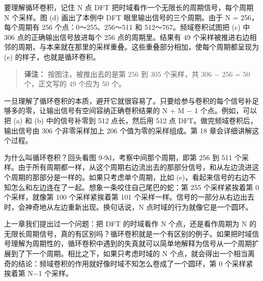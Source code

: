 要理解循环卷积，记住 N 点 DFT 把时域看作一个无限长的周期信号，每个周期 N
个采样。图 (d) 画出了本例中 DFT 眼里输出信号的三个周期。由于 N =
256，每个周期有 256 个点：0～255、256～511 和 512～767。频域卷积试图把
(c) 中 306 点的正确输出信号放进每个 256 点的周期里。结果有 49
个采样被推进右边相邻的周期，与本来就在那里的采样重叠。这些重叠部分相加，使每个周期都呈现为
(e) 的样子，也就是循环卷积。

\begin{quote}
\textbf{译注：} 按图注，被推出去的是第 256 到 305 个采样，共 306 − 256 =
50 个，正文写的 49 个应为 50 个。
\end{quote}

一旦理解了循环卷积的本质，避开它就很容易了。只要给参与卷积的每个信号补足够多的零，让输出信号有空间容纳正确卷积结果的
N + M − 1 个点。例如，可以把 (a) 和 (b) 中的信号补零到 512 点长，然后用
512 点 DFT。做完频域卷积后，输出信号由 306 个非零采样加上 206
个值为零的采样组成。第 18 章会详细讲解这个过程。

为什么叫循环卷积？回头看图 9-9d，考察中间那个周期，即第 256 到 511
个采样。由于所有周期都一样，从这个周期右边流出去的那部分信号，和从左边流进这个周期的那部分是一样的。如果只考虑单个周期，比如
(e)，看起来信号的右边不知怎么和左边连在了一起。想象一条咬住自己尾巴的蛇：第
255 个采样紧挨着第 0 个采样，就像第 100 个采样紧挨着第 101
个采样一样。信号的一部分从右边出去时，会神奇地从左边重新出现。换句话说，N
点时域的行为就像它是一个圆环。

上一章我们提出过一个问题：把 DFT 的时域看作 N 个点，还是看作周期为 N
的无限长周期信号，真的有区别吗？循环卷积就是一个有区别的例子。如果把时域信号理解为周期性的，循环卷积中遇到的失真就可以简单地解释为信号从一个周期扩展到了下一个周期。相比之下，如果只考虑时域的
N
个点，就会得出一个相当离奇的结论：频域卷积的作用就好像时域不知怎么卷成了一个圆环，第
0 个采样紧挨着第 N−1 个采样。

